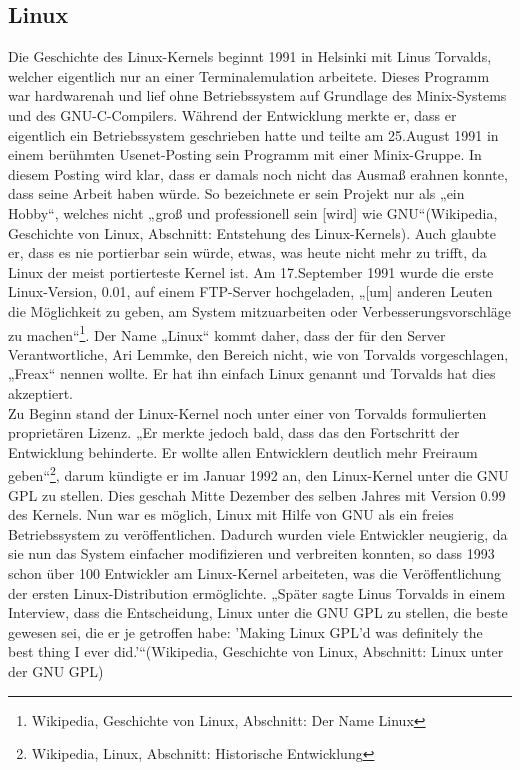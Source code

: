 \documentclass[a4paper,12pt]{article}
\begin{document}
\subsection{Linux}
Die Geschichte des Linux-Kernels beginnt 1991 in Helsinki mit Linus Torvalds, welcher eigentlich nur an einer Terminalemulation arbeitete. Dieses Programm war hardwarenah und lief ohne Betriebssystem auf Grundlage des Minix-Systems und des GNU-C-Compilers. Während der Entwicklung merkte er, dass er eigentlich ein Betriebssystem geschrieben hatte und teilte am 25.August 1991 in einem berühmten Usenet-Posting sein Programm mit einer Minix-Gruppe. In diesem Posting wird klar, dass er damals noch nicht das Ausmaß erahnen konnte, dass seine Arbeit haben würde. So bezeichnete er sein Projekt nur als „ein Hobby“, welches nicht „groß und professionell sein [wird] wie GNU“(Wikipedia, Geschichte von Linux, Abschnitt: Entstehung des Linux-Kernels). Auch glaubte er, dass es nie portierbar sein würde, etwas, was heute nicht mehr zu trifft, da Linux der meist portierteste Kernel ist. Am 17.September 1991 wurde die erste Linux-Version, 0.01, auf einem FTP-Server hochgeladen, „[um] anderen Leuten die Möglichkeit zu geben, am System mitzuarbeiten oder Verbesserungsvorschläge zu machen“\footnote{Wikipedia, Geschichte von Linux, Abschnitt: Der Name Linux}. Der Name „Linux“ kommt daher, dass der für den Server Verantwortliche, Ari Lemmke, den Bereich nicht, wie von Torvalds vorgeschlagen, „Freax“ nennen wollte. Er hat ihn einfach Linux genannt und Torvalds hat dies akzeptiert.\\
Zu Beginn stand der Linux-Kernel noch unter einer von Torvalds formulierten proprietären Lizenz. „Er merkte jedoch bald, dass das den Fortschritt der Entwicklung behinderte. Er wollte allen Entwicklern deutlich mehr Freiraum geben“\footnote{Wikipedia, Linux, Abschnitt: Historische Entwicklung}, darum kündigte er im Januar 1992 an, den Linux-Kernel unter die GNU GPL zu stellen. Dies geschah Mitte Dezember des selben Jahres mit Version 0.99 des Kernels. Nun war es möglich, Linux mit Hilfe von GNU als ein freies Betriebssystem zu veröffentlichen. Dadurch wurden viele Entwickler neugierig, da sie nun das System einfacher modifizieren und verbreiten konnten, so dass 1993 schon über 100 Entwickler am Linux-Kernel arbeiteten, was die Veröffentlichung der ersten Linux-Distribution ermöglichte. „Später sagte Linus Torvalds in einem Interview, dass die Entscheidung, Linux unter die GNU GPL zu stellen, die beste gewesen sei, die er je getroffen habe: 'Making Linux GPL'd was definitely the best thing I ever did.'“(Wikipedia, Geschichte von Linux, Abschnitt: Linux unter der GNU GPL)\\
\end{document}

